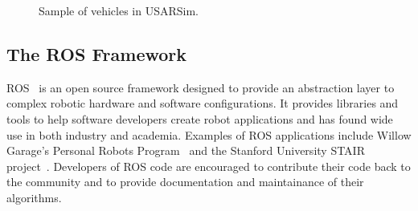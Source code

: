 \begin{figure}[t!]
\centering
{}\qquad
{}\qquad
{}\qquad
{}
\caption{Sample of vehicles in USARSim.}
\end{figure}

\subsection*{The ROS Framework}
ROS~\cite{ROSWeb} is an open source framework designed to provide an abstraction layer to complex robotic hardware and software configurations. It provides libraries and tools to help software developers create robot applications and has found wide use in both industry and academia. Examples of ROS applications include
Willow Garage's Personal Robots Program~\cite{WYOBEK.ICRA.2008} and the Stanford University STAIR project~\cite{QUIGLEY.AAAI.2007}. Developers of ROS code are encouraged to
contribute their code back to the community and to provide documentation and maintainance of their algorithms.

